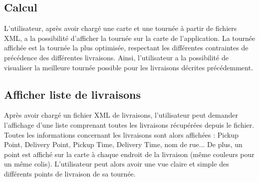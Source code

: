 \documentclass{scrartcl}
\begin{document}
\subsection{Calcul}
L'utilisateur, après avoir chargé une carte et une tournée à partir de fichiers XML, a la possibilité d'afficher la tournée sur la carte de l'application. La tournée affichée est la tournée la plus optimisée, respectant les différentes contraintes de précédence des différentes livraisons. Ainsi, l'utilisateur a la possibilité de visualiser la meilleure tournée possible pour les livraisons décrites précédemment.

\subsection{Afficher liste de livraisons}
Après avoir chargé un fichier XML de livraisons, l'utilisateur peut demander l'affichage d'une liste comprenant toutes les livraisons récupérées depuis le fichier. Toutes les informations concernant les livraisons sont alors affichées : Pickup Point, Delivery Point, Pickup Time, Delivery Time, nom de rue...
De plus, un point est affiché sur la carte à chaque endroit de la livraison (même couleurs pour un même colis). L'utilisateur peut alors avoir une vue claire et simple des différents points de livraison de sa tournée.
\end{document}
